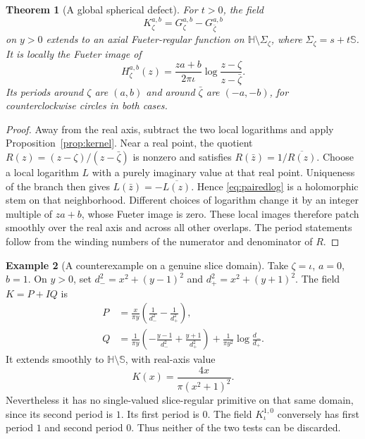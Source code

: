 \documentclass[11pt,a4paper]{article}
\numberwithin{equation}{section}
\newtheorem{theorem}{Theorem}[section]
\theoremstyle{definition}
\newtheorem{example}[theorem]{Example}
\theoremstyle{remark}
\newcommand{\HH}{\mathbb H}
\newcommand{\SSS}{\mathbb S}
\begin{document}
\begin{theorem}[A global spherical defect]
\label{thm:pairedkernel}
For $t>0$, the field
\begin{equation}
 K_\zeta^{a,b}=G_\zeta^{a,b}-G_{\bar\zeta}^{a,b}
 \label{eq:pairedkernel}
\end{equation}
on $y>0$ extends to an axial Fueter-regular function on
$\HH\setminus\Sigma_\zeta$, where
$\Sigma_\zeta=s+t\SSS$. It is locally the Fueter image of
\begin{equation}
 H_\zeta^{a,b}(z)=\frac{za+b}{2\pi\iota}
 \log\frac{z-\zeta}{z-\bar\zeta}.
 \label{eq:pairedlog}
\end{equation}
Its periods around $\zeta$ are $(a,b)$ and around $\bar\zeta$ are
$(-a,-b)$, for counterclockwise circles in both cases.
\end{theorem}
\begin{proof}
Away from the real axis, subtract the two local logarithms and apply
Proposition~\ref{prop:kernel}. Near a real point, the quotient
$R(z)=(z-\zeta)/(z-\bar\zeta)$ is nonzero and satisfies
$R(\bar z)=1/\overline{R(z)}$. Choose a local logarithm $L$ with a purely
imaginary value at that real point. Uniqueness of the branch then gives
$L(\bar z)=-\overline{L(z)}$. Hence \eqref{eq:pairedlog} is a
holomorphic stem on that neighborhood. Different choices of logarithm
change it by an integer multiple of $za+b$, whose Fueter image is zero.
These local images therefore patch smoothly over the real axis and
across all other overlaps. The period statements follow from the winding
numbers of the numerator and denominator of $R$.
\end{proof}

\begin{example}[A counterexample on a genuine slice domain]
\label{ex:counter}
Take $\zeta=\iota$, $a=0$, $b=1$. On $y>0$, set
$d_-^2=x^2+(y-1)^2$ and $d_+^2=x^2+(y+1)^2$. The field $K=P+I Q$ is
\begin{align}
 P&=\frac{x}{\pi y}\left(\frac1{d_-^2}-\frac1{d_+^2}\right),\\
 Q&=\frac1{\pi y}\left(-\frac{y-1}{d_-^2}
                         +\frac{y+1}{d_+^2}\right)
       +\frac1{\pi y^2}\log\frac{d_-}{d_+}.
 \label{eq:explicitcounter}
\end{align}
It extends smoothly to $\HH\setminus\SSS$, with real-axis value
\[
 K(x)=\frac{4x}{\pi(x^2+1)^2}.
\]
Nevertheless it has no single-valued slice-regular primitive on that
same domain, since its second period is $1$. Its first period is $0$.
The field $K_\iota^{1,0}$ conversely has first period $1$ and second
period $0$. Thus neither of the two tests can be discarded.
\end{example}
\end{document}
